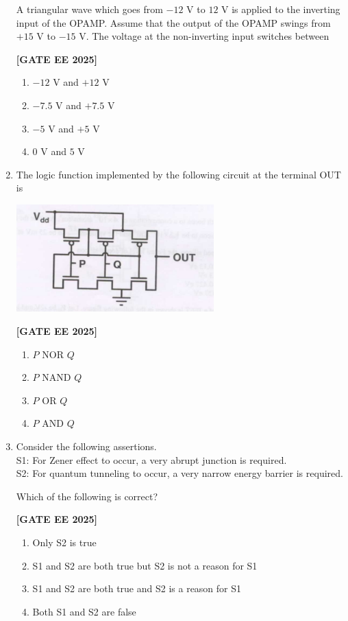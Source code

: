 \documentclass[12pt]{article}
\begin{document}
\begin{enumerate}[leftmargin=*, label=\textbf{Q.\arabic*:}]
A triangular wave which goes from $-12$ V to $12$ V is applied to the inverting input of the OPAMP. Assume that the output of the OPAMP swings from $+15$ V to $-15$ V. The voltage at the non-inverting input switches between
 
\noindent \textbf{[GATE EE 2025]}
\begin{enumerate}[label=(\Alph*)]
    \item $-12$ V and $+12$ V
    \item $-7.5$ V and $+7.5$ V
    \item $-5$ V and $+5$ V
    \item $0$ V and $5$ V
\end{enumerate}

\item The logic function implemented by the following circuit at the terminal OUT is
\begin{center}
\includegraphics[width=0.6\textwidth]{figs/q54.png}
\end{center}
 
\noindent \textbf{[GATE EE 2025]}
\begin{enumerate}[label=(\Alph*)]
    \item $P$ NOR $Q$
    \item $P$ NAND $Q$
    \item $P$ OR $Q$
    \item $P$ AND $Q$
\end{enumerate}

\item Consider the following assertions. \\
S1: For Zener effect to occur, a very abrupt junction is required. \\
S2: For quantum tunneling to occur, a very narrow energy barrier is required.

Which of the following is correct?
 
\noindent \textbf{[GATE EE 2025]}
\begin{enumerate}[label=(\Alph*)]
    \item Only S2 is true
    \item S1 and S2 are both true but S2 is not a reason for S1
    \item S1 and S2 are both true and S2 is a reason for S1
    \item Both S1 and S2 are false
\end{enumerate}


\end{enumerate}
\end{document}
